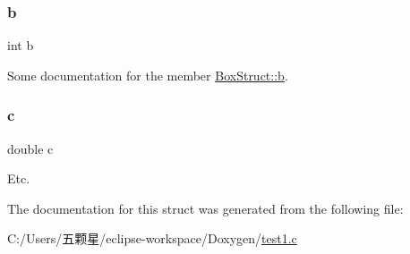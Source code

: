 \subsubsection{\texorpdfstring{b}{b}}
{\footnotesize\ttfamily int b}

Some documentation for the member \mbox{\hyperlink{struct_box_struct__struct_a148e3876077787926724625411d6e7a9}{Box\+Struct\+::b}}. \mbox{\label{struct_box_struct__struct_a2c09e929a6ea340fc9653cca414b11d3}} 
\subsubsection{\texorpdfstring{c}{c}}
{\footnotesize\ttfamily double c}

Etc. 

The documentation for this struct was generated from the following file\+:\begin{DoxyCompactItemize}
\item 
C\+:/\+Users/五颗星/eclipse-\/workspace/\+Doxygen/\mbox{\hyperlink{test1_8c}{test1.\+c}}\end{DoxyCompactItemize}
